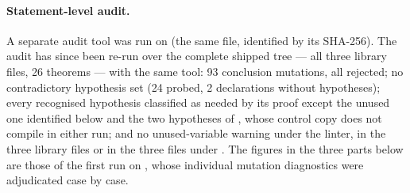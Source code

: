 \documentclass[11pt]{article}
\theoremstyle{definition}
\theoremstyle{remark}
\begin{document}
\paragraph{Statement-level audit.} A separate audit tool was run on  (the
same file, identified by its SHA-256). The audit has since been re-run over the complete shipped tree --- all three library files, 26
theorems --- with the same tool: 93 conclusion mutations, all rejected; no contradictory
hypothesis set (24 probed, 2 declarations without hypotheses); every recognised hypothesis
classified as needed by its proof except the unused one identified below and the two hypotheses
of , whose control copy does not compile in either run; and no unused-variable
warning under the linter, in the three library files or in the three files under .
The figures in the three parts below are those of the first run on , whose
individual mutation diagnostics were adjudicated case by case.
\end{document}
